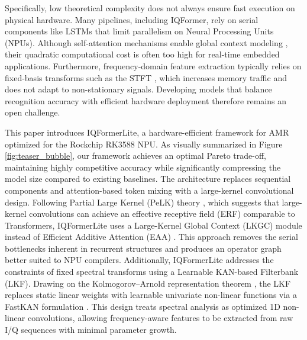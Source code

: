 \documentclass{article}
\begin{document}
	Specifically, low theoretical complexity does not always ensure fast execution on physical hardware. Many pipelines, including IQFormer, rely on serial components like LSTMs that limit parallelism on Neural Processing Units (NPUs). Although self-attention mechanisms enable global context modeling \cite{vaswani2017Attentionall}, their quadratic computational cost is often too high for real-time embedded applications. Furthermore, frequency-domain feature extraction typically relies on fixed-basis transforms such as the STFT \cite{lin2022Learningtimefrequencya}, which increases memory traffic and does not adapt to non-stationary signals. Developing models that balance recognition accuracy with efficient hardware deployment therefore remains an open challenge.
	
	This paper introduces IQFormerLite, a hardware-efficient framework for AMR optimized for the Rockchip RK3588 NPU. As visually summarized in Figure \ref{fig:teaser_bubble}, our framework achieves an optimal Pareto trade-off, maintaining highly competitive accuracy while significantly compressing the model size compared to existing baselines. The architecture replaces sequential components and attention-based token mixing with a large-kernel convolutional design. Following Partial Large Kernel (PeLK) theory \cite{chen2024PeLKParameterefficient}, which suggests that large-kernel convolutions can achieve an effective receptive field (ERF) comparable to Transformers, IQFormerLite uses a Large-Kernel Global Context (LKGC) module instead of Efficient Additive Attention (EAA) \cite{shaker2023SwiftFormerEfficient}. This approach removes the serial bottlenecks inherent in recurrent structures and produces an operator graph better suited to NPU compilers. Additionally, IQFormerLite addresses the constraints of fixed spectral transforms using a Learnable KAN-based Filterbank (LKF). Drawing on the Kolmogorov--Arnold representation theorem \cite{kolmogorov1961representationcontinuous, liu2025KANKolmogorovarnoldc}, the LKF replaces static linear weights with learnable univariate non-linear functions via a FastKAN formulation \cite{li2024Kolmogorovarnoldnetworks}. This design treats spectral analysis as optimized 1D non-linear convolutions, allowing frequency-aware features to be extracted from raw I/Q sequences with minimal parameter growth.
	
\end{document}
